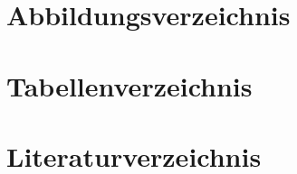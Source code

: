 \documentclass[12pt,a4paper,ngerman,captions=tableheading]{scrartcl}
\begin{document}

%




\newpage
\section{Abbildungsverzeichnis}



\section{Tabellenverzeichnis}



\section{Literaturverzeichnis}

%




%
%


\newpage
\end{document}
